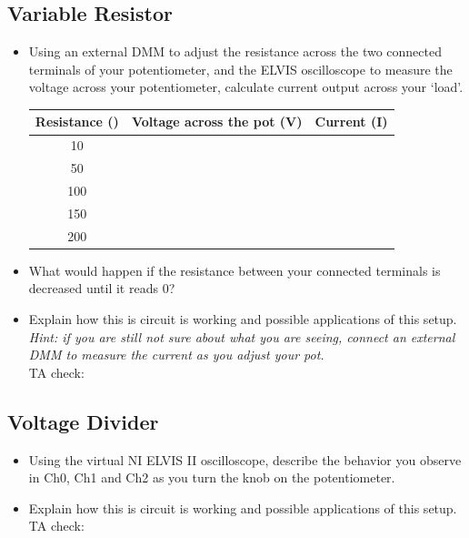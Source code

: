 \documentclass{article}
\begin{document}
\subsection*{Variable Resistor}
\begin{itemize}
	\item Using an external DMM to adjust the resistance across the two connected terminals of your potentiometer, and the ELVIS oscilloscope to measure the voltage across your potentiometer, calculate current output across your ‘load’.

		\begin{table}[h!]
		\centering
		\begin{tabular}[h!]{c|c|c}
		\toprule
		Resistance (\textOmega) & Voltage across the pot (V) & Current (I) \\
		\midrule
		10 & &\\
		\midrule
		50 & &\\
		\midrule
		100 & &\\
		\midrule
		150 & &\\
		\midrule
		200 & &\\
		\bottomrule
		\end{tabular}
		\end{table}
		
	\item What would happen if the resistance between your connected terminals is decreased until it reads 0\textOmega?\vspace{2cm}
	\item Explain how this is circuit is working and possible applications of this setup. \textit{Hint: if you are still not sure about what you are seeing, connect an external DMM to measure the current as you adjust your pot.}\\TA check: \underline{\hspace{2cm}}
\end{itemize}

\subsection*{Voltage Divider}
\begin{itemize}
	\item Using the virtual NI ELVIS II oscilloscope, describe the behavior you observe in Ch0, Ch1 and Ch2 as you turn the knob on the potentiometer.\vspace{2cm}
	\item Explain how this is circuit is working and possible applications of this setup.\\TA check: \underline{\hspace{2cm}}\vspace{2cm}
\end{itemize}
\end{document}
